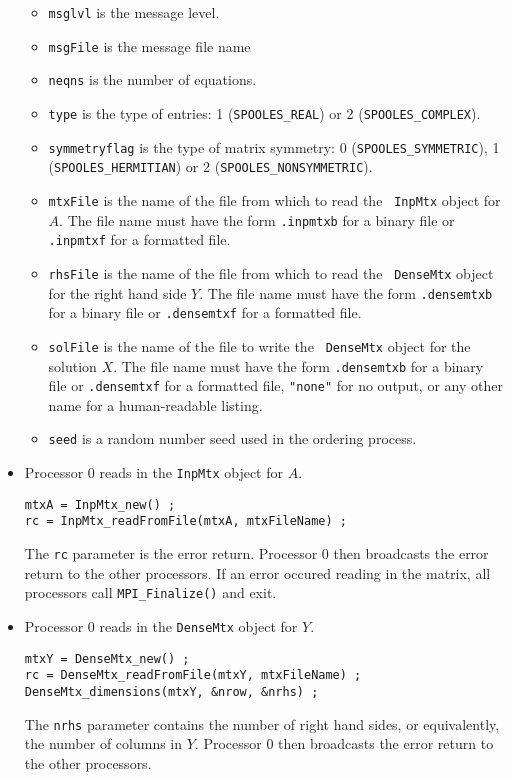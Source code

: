 \begin{itemize}
\begin{itemize}
\item {\tt msglvl} is the message level.
\item {\tt msgFile} is the message file name
\item {\tt neqns} is the number of equations.
\item {\tt type} is the type of entries:
1 ({\tt SPOOLES\_REAL}) or
2 ({\tt SPOOLES\_COMPLEX}).
\item {\tt symmetryflag} is the type of matrix symmetry:
0 ({\tt SPOOLES\_SYMMETRIC}),
1 ({\tt SPOOLES\_HERMITIAN}) or
2 ({\tt SPOOLES\_NONSYMMETRIC}).
\item {\tt mtxFile} is the name of the file from which to read the {\tt
InpMtx} object for $A$.
The file name must have the form {\tt *.inpmtxb} for a binary file or
{\tt *.inpmtxf} for a formatted file.
\item {\tt rhsFile} is the name of the file from which to read the {\tt
DenseMtx} object for the right hand side $Y$.
The file name must have the form {\tt *.densemtxb} for a binary file or
{\tt *.densemtxf} for a formatted file.
\item {\tt solFile} is the name of the file to write the {\tt
DenseMtx} object for the solution $X$.
The file name must have the form {\tt *.densemtxb} for a binary file or
{\tt *.densemtxf} for a formatted file, {\tt "none"} for no output,
or any other name for a human-readable listing.
\item {\tt seed} is a random number seed used in the ordering process.
\end{itemize}
%
\item Processor 0 reads in the {\tt InpMtx} object for $A$.
\begin{verbatim}
mtxA = InpMtx_new() ;
rc = InpMtx_readFromFile(mtxA, mtxFileName) ;
\end{verbatim}
The {\tt rc} parameter is the error return. 
Processor 0 then broadcasts the error return to the other processors.
If an error occured reading in the matrix, all processors call
\texttt{MPI\_Finalize()} and exit.
%
\item Processor 0 reads in the {\tt DenseMtx} object for $Y$.
\begin{verbatim}
mtxY = DenseMtx_new() ;
rc = DenseMtx_readFromFile(mtxY, mtxFileName) ;
DenseMtx_dimensions(mtxY, &nrow, &nrhs) ;
\end{verbatim}
The {\tt nrhs} parameter contains the number of right hand sides,
or equivalently, the number of columns in $Y$.
Processor 0 then broadcasts the error return to the other processors.

\end{itemize}
